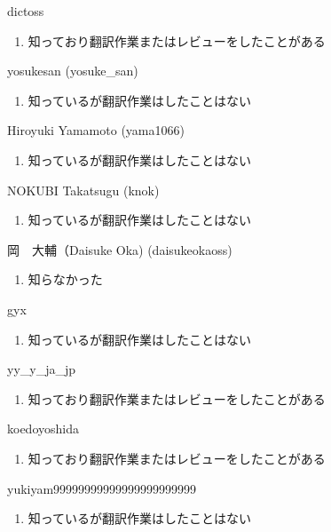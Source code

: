 \begin{prework}{ dictoss }
  \begin{enumerate}
  \item 知っており翻訳作業またはレビューをしたことがある
  \end{enumerate}
\end{prework}

\begin{prework}{ yosukesan (yosuke\_san) }
  \begin{enumerate}
  \item 知っているが翻訳作業はしたことはない
  \end{enumerate}
\end{prework}

\begin{prework}{ Hiroyuki Yamamoto (yama1066) }
  \begin{enumerate}
  \item 知っているが翻訳作業はしたことはない
  \end{enumerate}
\end{prework}

\begin{prework}{ NOKUBI Takatsugu (knok) }
  \begin{enumerate}
  \item 知っているが翻訳作業はしたことはない
  \end{enumerate}
\end{prework}

\begin{prework}{ 岡　大輔（Daisuke Oka) (daisukeokaoss) }
  \begin{enumerate}
  \item 知らなかった
  \end{enumerate}
\end{prework}

\begin{prework}{ gyx }
  \begin{enumerate}
  \item 知っているが翻訳作業はしたことはない
  \end{enumerate}
\end{prework}

\begin{prework}{ yy\_y\_ja\_jp }
  \begin{enumerate}
  \item 知っており翻訳作業またはレビューをしたことがある
  \end{enumerate}
\end{prework}

\begin{prework}{ koedoyoshida }
  \begin{enumerate}
  \item 知っており翻訳作業またはレビューをしたことがある
  \end{enumerate}
\end{prework}

\begin{prework}{ yukiyam99999999999999999999999 }
  \begin{enumerate}
  \item 知っているが翻訳作業はしたことはない
  \end{enumerate}
\end{prework}
